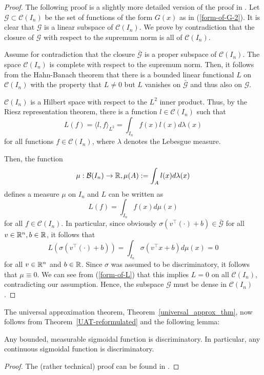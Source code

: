 \begin{proof}
	The following proof is a slightly more detailed version of the proof in \cite[p.~306]{Cybenko1989}.
	Let $\mathcal{G} \subset \mathcal{C}(I_n)$ be the set of functions of the form $G(x)$ as in (\ref{form-of-G-2}). It is clear that $\mathcal{G}$ is a linear subspace of $\mathcal{C}(I_n)$. We prove by contradiction that the closure of $\mathcal{G}$ with respect to the supremum norm is all of $\mathcal{C}(I_n)$. 
	
	Assume for contradiction that the closure $\bar{\mathcal{G}}$ is a proper subspace of $\mathcal{C}(I_n)$. The space $\mathcal{C}(I_n)$ is complete with respect to the supremum norm. Then, it follows from the Hahn-Banach theorem that there is a bounded linear functional $L$ on $\mathcal{C}(I_n)$ with the property that $L\neq 0$ but $L$ vanishes on $\bar{\mathcal{G}}$ and thus also on $\mathcal{G}$. 
	
	$\mathcal{C}(I_n)$ is a Hilbert space with respect to the $L^2$ inner product. Thus, by the Riesz representation theorem, there is a function $l\in \mathcal{C}(I_n)$ such that 
	$$
	L(f) = \langle l,f\rangle_{L^2} = \int_{I_n} f(x)l(x) d\lambda(x) 
	$$ 
	for all functions $f\in\mathcal{C}(I_n)$, where $\lambda$ denotes the Lebesgue measure. 
	
	Then, the function 
	$$
	\mu: \mathcal{B}(I_n) \to \mathbb{R}, \mu(A) := \int_A l(x) d\lambda(x)
	$$
	defines a measure $\mu$ on $I_n$ and $L$ can be written as 
	\begin{equation}\label{form-of-L}
			L(f) = \int_{I_n} f(x) d\mu(x)		
	\end{equation}
	for all $f\in\mathcal{C}(I_n)$. In particular, since obviously $\sigma(v^{\top}(\cdot) + b) \in \bar{\mathcal{G}}$ for all $v \in \mathbb{R}^n, b\in \mathbb{R}$, it follows that
	$$
	L(\sigma(v^{\top}(\cdot) + b)) = \int_{I_n} \sigma(v^{\top}x + b) d\mu(x) = 0
	$$
	for all $v \in \mathbb{R}^n$ and $b\in \mathbb{R}$.
	Since $\sigma$ was assumed to be discriminatory, it follows that $\mu\equiv 0$. We can see from (\ref{form-of-L}) that this implies $L = 0$ on all $\mathcal{C}(I_n)$, contradicting our assumption. Hence, the subspace $\mathcal{G}$ must be dense in $\mathcal{C}(I_n)$.
\end{proof}

The universal approximation theorem, Theorem~\ref{universal_approx_thm}, now follows from Theorem~\ref{UAT-reformulated} and the following lemma: 

\begin{lemma}
	Any bounded, measurable sigmoidal function is discriminatory. In particular, any continuous sigmoidal function is discriminatory.
\end{lemma}
\begin{proof}
	The (rather technical) proof can be found in \cite[pp.~307f.]{Cybenko1989}. 
\end{proof}

